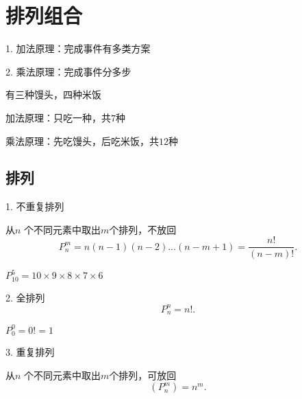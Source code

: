 \section{排列组合}%
\label{sub:排列组合}
1. 加法原理：完成事件有多类方案

2. 乘法原理：完成事件分多步
\begin{eg}
    有三种馒头，四种米饭

    加法原理：只吃一种，共$7$种

    乘法原理：先吃馒头，后吃米饭，共$12$种
\end{eg}
\subsection{排列}%
\label{sub:排列}
1. 不重复排列

从$n$ 个不同元素中取出$m$个排列，不放回
\[
    P_n^m=n\left( n-1 \right) \left( n-2 \right) \ldots\left( n-m+1 \right)=\frac{n!}{\left( n-m \right) !} 
.\] 
\begin{eg}
    $P^5_{10}=10\times 9\times 8\times 7\times 6$
\end{eg}
2. 全排列
\[
    P^n_n=n!
.\] 
\begin{eg}
    $P_{0}^{0}=0! =1$
\end{eg}
3. 重复排列

从$n$ 个不同元素中取出$m$个排列，可放回
\[
    (P_n^m)=n^m
.\] 
